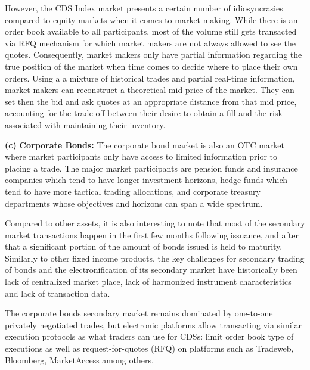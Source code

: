 However, the CDS Index market presents a certain number of idiosyncrasies compared to equity markets when it comes to market making. While there is an order book available to all participants, most of the volume still gets transacted via RFQ mechanism for which market makers are not always allowed to see the quotes. Consequently, market makers only have partial information regarding the true position of the market when time comes to decide where to place their own orders. Using a a mixture of historical trades and partial real-time information, market makers can reconstruct a theoretical mid price of the market. They can set then the bid and ask quotes at an appropriate distance from that mid price, accounting for the trade-off between their desire to obtain a fill and the risk associated with maintaining their inventory. \twomedskip


\noindent\textbf{(c)} \textbf{Corporate Bonds:} The corporate bond market is also an OTC market where market participants only have access to limited information prior to placing a trade. The major market participants are pension funds and insurance companies which tend to have longer investment horizons, hedge funds which tend to have more tactical trading allocations, and corporate treasury departments whose objectives and horizons can span a wide spectrum.


Compared to other assets, it is also interesting to note that most of the secondary market transactions happen in the first few months following issuance, and after that a significant portion of the amount of bonds issued is held to maturity. Similarly to other fixed income products, the key challenges for secondary trading of bonds and the electronification of its secondary market have historically been lack of centralized market place, lack of harmonized instrument characteristics and lack of transaction data.


The corporate bonds secondary market remains dominated by one-to-one privately negotiated trades, but electronic platforms allow transacting via similar execution protocols as what traders can use for CDSs: limit order book type of executions as well as request-for-quotes (RFQ) on platforms such as Tradeweb, Bloomberg, MarketAccess among others.


